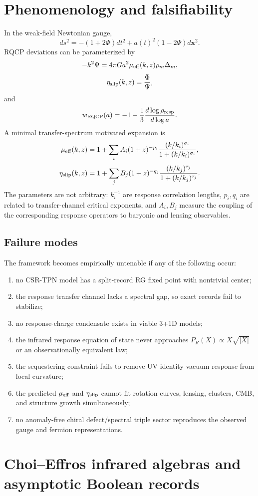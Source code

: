 \documentclass[11pt]{article}
\begin{document}
\section{Phenomenology and falsifiability}\label{app:phenom}

In the weak-field Newtonian gauge,
\[
ds^2=-(1+2\Phi)dt^2+a(t)^2(1-2\Psi)d\mathbf x^2.
\]
RQCP deviations can be parameterized by
\[
-k^2\Psi=4\pi Ga^2\mu_{\rm eff}(k,z)\rho_m\Delta_m,
\]
\[
\eta_{\rm slip}(k,z)=\frac{\Phi}{\Psi},
\]
and
\[
w_{\rm RQCP}(a)=-1-\frac13\frac{d\log\rho_{\rm resp}}{d\log a}.
\]
A minimal transfer-spectrum motivated expansion is
\[
\mu_{\rm eff}(k,z)=1+\sum_iA_i(1+z)^{-p_i}\frac{(k/k_i)^{\sigma_i}}{1+(k/k_i)^{\sigma_i}},
\]
\[
\eta_{\rm slip}(k,z)=1+\sum_jB_j(1+z)^{-q_j}\frac{(k/k_j)^{\tau_j}}{1+(k/k_j)^{\tau_j}}.
\]
The parameters are not arbitrary: $k_i^{-1}$ are response correlation lengths, $p_i,q_i$ are related to transfer-channel critical exponents, and $A_i,B_j$ measure the coupling of the corresponding response operators to baryonic and lensing observables.

\subsection*{Failure modes}
The framework becomes empirically untenable if any of the following occur:
\begin{enumerate}[label=(F\arabic*)]
\item no CSR-TPN model has a split-record RG fixed point with nontrivial center;
\item the response transfer channel lacks a spectral gap, so exact records fail to stabilize;
\item no response-charge condensate exists in viable 3+1D models;
\item the infrared response equation of state never approaches $P_R(X)\propto X\sqrt{|X|}$ or an observationally equivalent law;
\item the sequestering constraint fails to remove UV identity vacuum response from local curvature;
\item the predicted $\mu_{\rm eff}$ and $\eta_{\rm slip}$ cannot fit rotation curves, lensing, clusters, CMB, and structure growth simultaneously;
\item no anomaly-free chiral defect/spectral triple sector reproduces the observed gauge and fermion representations.
\end{enumerate}

\section{Choi--Effros infrared algebras and asymptotic Boolean records}\label{app:v62-choi-effros}
\end{document}
